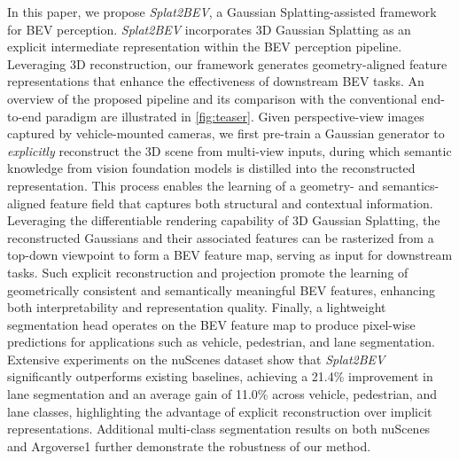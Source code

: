 
In this paper, we propose \textit{Splat2BEV}, a Gaussian Splatting-assisted framework for BEV perception. 
\textit{Splat2BEV} incorporates 3D Gaussian Splatting as an explicit intermediate representation within the BEV perception pipeline.
Leveraging 3D reconstruction, our framework generates geometry-aligned feature representations that enhance the effectiveness of downstream BEV tasks.
An overview of the proposed pipeline and its comparison with the conventional end-to-end paradigm are illustrated in \cref{fig:teaser}.
Given perspective-view images captured by vehicle-mounted cameras, 
we first pre-train a Gaussian generator to \textit{explicitly} reconstruct the 3D scene from multi-view inputs, during which semantic knowledge from vision foundation models is distilled into the reconstructed representation.
This process enables the learning of a geometry- and semantics-aligned feature field that captures both structural and contextual information.
Leveraging the differentiable rendering capability of 3D Gaussian Splatting, the reconstructed Gaussians and their associated features can be rasterized from a top-down viewpoint to form a BEV feature map, serving as input for downstream tasks.
Such explicit reconstruction and projection promote the learning of geometrically consistent and semantically meaningful BEV features, enhancing both interpretability and representation quality.
Finally, a lightweight segmentation head operates on the BEV feature map to produce pixel-wise predictions for applications such as vehicle, pedestrian, and lane segmentation. 
Extensive experiments on the nuScenes dataset show that \textit{Splat2BEV} significantly outperforms existing baselines, achieving a 21.4\% improvement in lane segmentation and an average gain of 11.0\% across vehicle, pedestrian, and lane classes, highlighting the advantage of explicit reconstruction over implicit representations.
Additional multi-class segmentation results on both nuScenes and Argoverse1 further demonstrate the robustness of our method.

